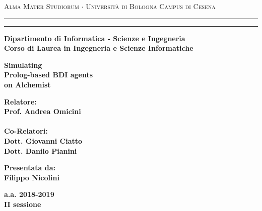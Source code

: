 \documentclass[12pt,a4paper]{report}
\begin{document}
\begin{titlepage}
\begin{center}
{{\Large{\textsc{Alma Mater Studiorum $\cdot$ Universit\`a di Bologna}}}}
{\small{\textsc{Campus di Cesena}}}
\rule[0.1cm]{15.8cm}{0.1mm}
\rule[0.5cm]{15.8cm}{0.6mm}
{\small{\bf Dipartimento di Informatica - Scienze e Ingegneria}}
\\
\medskip
{\small{\bf Corso di Laurea in Ingegneria e Scienze Informatiche}}
\end{center}
\vspace{15mm}
\begin{center}
{\LARGE{\bf Simulating}}\\
\vspace{3mm}
{\LARGE{\bf Prolog-based BDI agents}}\\
\vspace{3mm}
{\LARGE{\bf on Alchemist}}\\
\end{center}
\vspace{40mm}
\par
\noindent
\begin{minipage}[t]{0.47\textwidth}
{\large{\bf Relatore:\\
Prof. Andrea Omicini\\\\}}
{\large{\bf Co-Relatori:\\
Dott. Giovanni Ciatto\\
Dott. Danilo Pianini
}}
\end{minipage}
\hfill
\begin{minipage}[t]{0.47\textwidth}\raggedleft
{\large{\bf Presentata da:\\
Filippo Nicolini}}
\end{minipage}
\vspace{20mm}
\begin{center}
{\large{\bf
a.a. 2018-2019\\
II sessione}}%
\end{center}
\end{titlepage}
\end{document}
